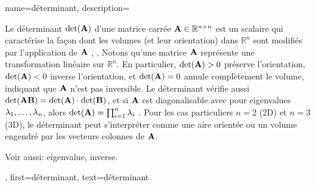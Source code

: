 {
	name={déterminant},
	description={
		Le déterminant $\det({\bf A})$ d'une matrice carrée 
		${\bf A} \in \mathbb{R}^{n \times n}$ est un scalaire qui caractérise la façon dont les volumes (et leur orientation) dans $\mathbb{R}^n$ sont modifiés par l’application de ${\bf A}$ \cite{GolubVanLoanBook}, \cite{Strang2007}. 
		Notons qu’une matrice ${\bf A}$ représente une transformation linéaire sur $\mathbb{R}^{n}$. 
		En particulier, $\det({\bf A}) > 0$ préserve l’orientation, $\det({\bf A}) < 0$ inverse l’orientation, 
		et $\det({\bf A}) = 0$ annule complètement le volume, indiquant que ${\bf A}$ n’est pas inversible. 
		Le déterminant vérifie aussi $\det({\bf A} {\bf B}) = \det({\bf A}) \cdot \det({\bf B})$, et si ${\bf A}$ est 
		diagonalisable avec pour \glspl{eigenvalue} $\lambda_{1}, \ldots, \lambda_{n}$, alors $\det({\bf A}) = \prod_{i=1}^{n} \lambda_{i}$ \cite{HornMatAnalysis}.
		Pour les cas particuliers $n=2$ (2D) et $n=3$ (3D), le déterminant peut s’interpréter comme une aire orientée ou un volume engendré par les vecteurs colonnes de ${\bf A}$.
		\begin{figure}[H]
			\begin{center}
			\end{center}
		\end{figure}
		Voir aussi: \gls{eigenvalue}, \gls{inverse}.
	},
	first={déterminant},
	text={déterminant}
}

